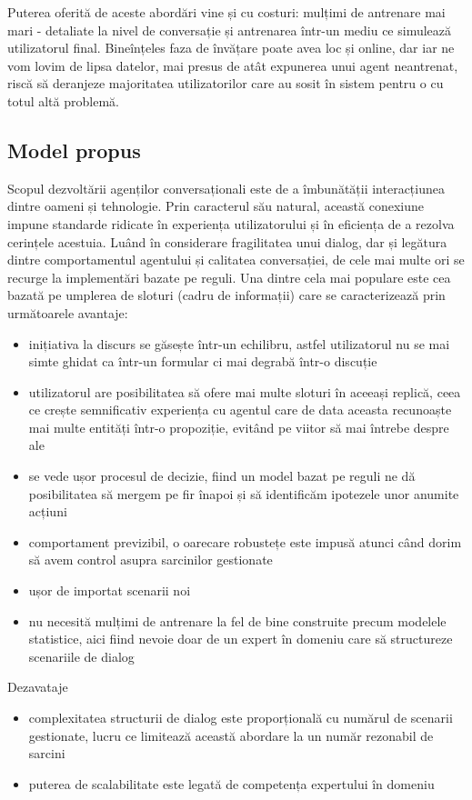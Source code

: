 Puterea oferită de aceste abordări vine și cu costuri: mulțimi de antrenare mai mari - detaliate la nivel de conversație și antrenarea într-un mediu ce simulează utilizatorul final. Bineînțeles faza de învățare poate avea loc și online, dar iar ne vom lovim de lipsa datelor, mai presus de atât expunerea unui agent neantrenat, riscă să deranjeze majoritatea utilizatorilor care au sosit în sistem pentru o cu totul altă problemă.

\subsection{Model propus}

Scopul dezvoltării agenților conversaționali este de a îmbunătății interacțiunea dintre oameni și tehnologie. Prin caracterul său natural, această conexiune impune standarde ridicate în experiența utilizatorului și în eficiența de a rezolva cerințele acestuia. Luând în considerare fragilitatea unui dialog, dar și legătura dintre comportamentul agentului și calitatea conversației, de cele mai multe ori se recurge la implementări bazate pe reguli. Una dintre cela mai populare este cea bazată pe umplerea de sloturi (cadru de informații) care se caracterizează prin următoarele avantaje:
\begin{itemize}
	\item inițiativa la discurs se găsește într-un echilibru, astfel utilizatorul nu se mai simte ghidat ca într-un formular ci mai degrabă într-o discuție
	\item utilizatorul are posibilitatea să ofere mai multe sloturi în aceeași replică, ceea ce crește semnificativ experiența cu agentul care de data aceasta recunoaște mai multe entități într-o propoziție, evitând pe viitor să mai întrebe despre ale
	\item se vede ușor procesul de decizie, fiind un model bazat pe reguli ne dă posibilitatea să mergem pe fir înapoi și să identificăm ipotezele unor anumite acțiuni
	\item comportament previzibil, o oarecare robustețe este impusă atunci când dorim să avem control asupra sarcinilor gestionate
	\item ușor de importat scenarii noi
	\item nu necesită mulțimi de antrenare la fel de bine construite precum modelele statistice, aici fiind nevoie doar de un expert în domeniu care să structureze scenariile de dialog
\end{itemize}

Dezavataje
\begin{itemize}
	\item complexitatea structurii de dialog este proporțională cu numărul de scenarii gestionate, lucru ce limitează această abordare la un număr rezonabil de sarcini
	\item puterea de scalabilitate este legată de competența expertului în domeniu	
\end{itemize}

